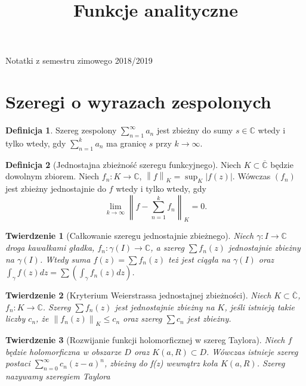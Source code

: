\documentclass[11pt]{article}
\title{Funkcje analityczne}
\newcommand{\abs}[1]{\left|#1\right|} %
\newcommand{\norm}[1]{\left\lVert#1\right\rVert} %
\newcommand{\extcomplex}{\overline{\mathbb{C}}} %
\theoremstyle{plain}
\newtheorem*{theorem}{Twierdzenie}
\theoremstyle{definition}
\newtheorem*{definition}{Definicja}
\theoremstyle{remark}
\begin{document}
{\huge\bfseries\@title\par}
\vspace{0.1cm}
{\Large Notatki z semestru zimowego 2018/2019\par}


\section{Szeregi o wyrazach zespolonych}

\begin{definition}
  Szereg zespolony $\sum_{n=1}^{\infty} a_{n}$ jest zbieżny do sumy $ s \in \mathbb{C} $ wtedy i tylko wtedy, gdy $ \sum_{n=1}^{k} a_{n} $ ma granicę $ s $ przy $ k\to\infty $.
\end{definition}

\begin{definition}[Jednostajna zbieżność szeregu funkcyjnego]
  Niech $ K \subset \extcomplex $ będzie dowolnym zbiorem. Niech $ f_{n} \colon K \to \mathbb{C} $, $ \norm{f}_{K} = \sup_{K}\abs{f(z)} $. Wówczas $ (f_{n}) $ jest zbieżny jednostajnie do $ f $ wtedy i tylko wtedy, gdy
  $$ \lim_{k\to\infty} \norm{f - \sum_{n=1}^{k} f_{n}}_{K} = 0. $$
\end{definition}

\begin{theorem}[Całkowanie szeregu jednostajnie zbieżnego]
  Niech $ \gamma \colon I \to \mathbb{C} $ droga kawałkami gładka, $ f_{n} \colon \gamma(I) \to \mathbb{C} $, a szereg $ \sum f_{n}(z) $ jednostajnie zbieżny na $ \gamma(I) $. Wtedy suma $ f(z) = \sum f_{n}(z) $ też jest ciągła na $ \gamma(I) $ oraz $ \int_{\gamma} f(z) dz = \sum (\int_{\gamma} f_{n}(z) dz) $.
\end{theorem}

\begin{theorem}[Kryterium Weierstrassa jednostajnej zbieżności]
  Niech $ K \subset \extcomplex $, $ f_{n} \colon K \to \mathbb{C} $. Szereg $ \sum f_{n}(z) $ jest jednostajnie zbieżny na $ K $, jeśli istnieją takie liczby $ c_{n} $, że $ \norm{f_n(z)}_K \leq c_{n} $ oraz szereg $ \sum c_{n} $ jest zbieżny.
\end{theorem}

\begin{theorem}[Rozwijanie funkcji holomorficznej w szereg Taylora]
  Niech $ f $ będzie holomorficzna w obszarze $ D $ oraz $ K(a, R) \subset D $. Wówczas istnieje szereg postaci $ \sum_{n = 0}^{\infty} c_{n}(z-a)^{n} $, zbieżny do f(z) wewnątrz koła $ K(a, R) $. Szereg nazywamy szeregiem Taylora
\end{theorem}
\end{document}
